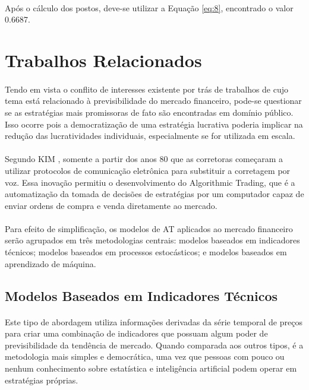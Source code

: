 \paragraph{} Após o cálculo dos postos, deve-se utilizar a Equação \ref{eq:8}, encontrado o valor 0.6687.

\section{Trabalhos Relacionados}

\paragraph{} Tendo em vista o conflito de interesses existente por trás de trabalhos de cujo tema está relacionado à previsibilidade do mercado financeiro, pode-se questionar se as estratégias mais promissoras de fato são encontradas em domínio público. Isso ocorre pois a democratização de uma estratégia lucrativa poderia implicar na redução das lucratividades individuais, especialmente se for utilizada em escala.

\paragraph{} Segundo KIM \cite{kim2010electronic}, somente a partir dos anos 80 que as corretoras começaram a utilizar protocolos de comunicação eletrônica para substituir a corretagem por voz. Essa inovação permitiu o desenvolvimento do Algorithmic Trading, que é a automatização da tomada de decisões de estratégias por um computador capaz de enviar ordens de compra e venda diretamente ao mercado.

\paragraph{} Para efeito de simplificação, os modelos de AT aplicados ao mercado financeiro serão agrupados em três metodologias centrais: modelos baseados em indicadores técnicos; modelos baseados em processos estocásticos; e modelos baseados em aprendizado de máquina.


\subsection{Modelos Baseados em Indicadores Técnicos}

\paragraph{} Este tipo de abordagem utiliza informações derivadas da série temporal de preços para criar uma combinação de indicadores que possuam algum poder de previsibilidade da tendência de mercado. Quando comparada aos outros tipos, é a metodologia mais simples e democrática, uma vez que pessoas com pouco ou nenhum conhecimento sobre estatística e inteligência artificial podem operar em estratégias próprias.

